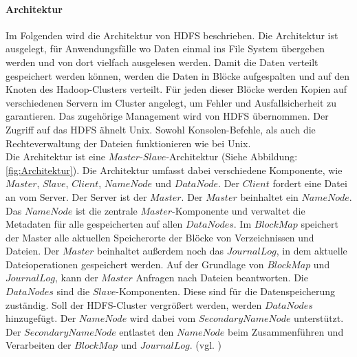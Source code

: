 \paragraph{Architektur}$\;$ \\
Im Folgenden wird die Architektur von HDFS beschrieben. Die Architektur ist ausgelegt, für Anwendungsfälle wo Daten einmal ins File System übergeben werden und von dort vielfach ausgelesen werden. Damit die Daten verteilt gespeichert werden können, werden die Daten in Blöcke aufgespalten und auf den Knoten des Hadoop-Clusters verteilt. Für jeden dieser Blöcke werden Kopien auf verschiedenen Servern im Cluster angelegt, um Fehler und Ausfallsicherheit zu garantieren. Das zugehörige Management wird von HDFS übernommen. Der Zugriff auf das HDFS ähnelt Unix. Sowohl Konsolen-Befehle, als auch die Rechteverwaltung der Dateien funktionieren wie bei Unix.\\
Die Architektur ist eine $Master$-$Slave$-Architektur (Siehe Abbildung:\ref{fig:Architektur}). Die Architektur umfasst dabei verschiedene Komponente, wie $Master$, $Slave$, $Client$, $NameNode$ und $DataNode$. Der $Client$ fordert eine Datei an vom Server. Der Server ist der $Master$. Der $Master$ beinhaltet ein $NameNode$. Das $NameNode$ ist die zentrale $Master$-Komponente und verwaltet die Metadaten für alle gespeicherten auf allen $DataNodes$. Im $Block Map$ speichert der Master alle aktuellen Speicherorte der Blöcke von Verzeichnissen und Dateien. Der $Master$ beinhaltet außerdem noch das $Journal Log$, in dem aktuelle Dateioperationen gespeichert werden. Auf der Grundlage von $Block Map$ und $Journal Log$, kann der $Master$ Anfragen nach Dateien beantworten. Die $Data Nodes$ sind die $Slave$-Komponenten. Diese sind für die Datenspeicherung zuständig. Soll der HDFS-Cluster vergrößert werden, werden $DataNodes$ hinzugefügt. Der $NameNode$ wird dabei vom $SecondaryNameNode$ unterstützt. Der $SecondaryNameNode$ entlastet den $NameNode$ beim Zusammenführen und Verarbeiten der $Block Map$ und $Journal Log$. (vgl. \cite{uwe})
